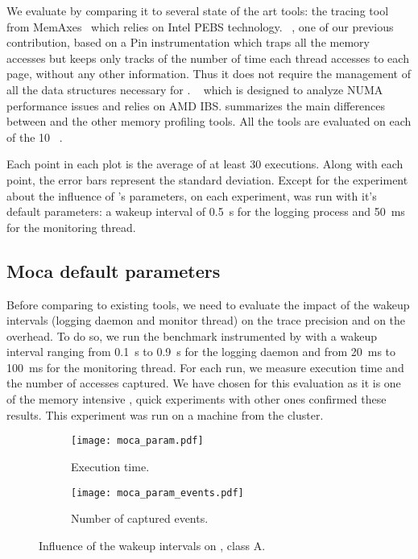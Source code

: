 We evaluate \Moca by comparing it to several state of the art tools: \Mitos
the tracing tool from MemAxes~\cite{Gimenez14Dissecting} which relies on Intel
PEBS technology. 
\TABARNAC~\cite{Beniamine15TABARNACRR}, one of our previous contribution,
based on a Pin instrumentation which traps all the memory accesses but keeps
only tracks of the number of time each thread accesses to each page, without
any other information. Thus it does not require the management of all the data
structures necessary for \Moca.
\MemProf~\cite{Lachaize12MemProf} which is designed to analyze NUMA
performance issues and relies on AMD IBS.
 summarizes the main differences
between \Moca and the other memory profiling tools. All the tools are
evaluated on each of the 10 \NPB~\cite{Jin1999}.

Each point in each plot is the average of at least $30$ executions. Along with each point,
the error bars represent the standard deviation.
Except for the experiment about the influence of \Moca's parameters, on each
experiment, \Moca was run with it's default parameters: a wakeup interval of
\SI{0.5}{s} for the logging process and \SI{50}{ms} for the monitoring thread.

\subsection{Moca default parameters}
\label{sec:expe-param}

Before comparing \Moca to existing tools, we need to evaluate the impact of
the wakeup intervals (logging daemon and monitor thread) on the trace
precision and on the overhead. To do so, we run the \IS benchmark instrumented by \Moca with
a wakeup interval ranging from \SI{0.1}{s} to  \SI{0.9}{s} for the logging daemon and from \SI{20}{ms} to
\SI{100}{ms} for the monitoring thread. For each run, we measure \IS execution time and the number of
accesses captured. We have chosen \IS for this evaluation as it is one of the memory intensive \NPB,
quick experiments with other ones confirmed these results. This experiment was
run on a machine from the \Edel cluster.

\begin{figure}[htb]
    \centering
    \begin{subfigure}{\linewidth}
        \texttt{[image: moca\_param.pdf]}
        \caption{Execution time.}
        \label{fig:param_time}
    \end{subfigure}
    \begin{subfigure}{\linewidth}
        \texttt{[image: moca\_param\_events.pdf]}
        \caption{Number of captured events.}
        \label{fig:param_evts}
    \end{subfigure}
    \caption{Influence of the wakeup intervals on \IS, class A.}
    \label{fig:param}
\end{figure}


